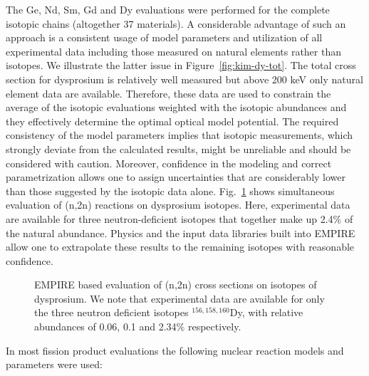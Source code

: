 The Ge, Nd, Sm, Gd and Dy evaluations were performed for the complete
isotopic chains (altogether 37 materials). A considerable advantage of such
an approach is a consistent usage of model parameters and utilization of all
experimental data including those measured on natural elements rather than
isotopes. We illustrate the latter issue in Figure~\ref{fig:kim-dy-tot}. The
total cross section for dysprosium is relatively well measured but above 200
keV only natural element data are available. Therefore, these data are used
to constrain the average of the isotopic evaluations weighted with the
isotopic abundances and they effectively determine the optimal optical model
potential. The required consistency of the model parameters implies that
isotopic measurements, which strongly deviate from the calculated results,
might be unreliable and should be considered with caution. Moreover,
confidence in the modeling and correct parametrization allows one to assign
uncertainties that are considerably lower than those suggested by the
isotopic data alone. Fig.~\ref{fig:kim-dy-n2n} shows simultaneous evaluation
of (n,2n) reactions on dysprosium isotopes.
Here, experimental data are available for three neutron-deficient
isotopes that together make up  2.4\% of
the natural abundance. Physics and the input data libraries built into EMPIRE
allow one to extrapolate these results to the remaining isotopes with
reasonable confidence.

\begin{figure*}[htbp]
 
\caption{EMPIRE based evaluation of total cross sections on isotopes of
dysprosium. The left panel shows the comparison of data measured on the
natural element with the appropriate average of the isotopic cross sections
plotted in the right panel.}
\label{fig:kim-dy-tot}
\end{figure*}

\begin{figure}[htbp]
\caption{EMPIRE based evaluation of (n,2n) cross sections on isotopes of
dysprosium. We note that experimental data are available for only the three
neutron deficient isotopes $^{156,158,160}$Dy, with relative abundances of
0.06, 0.1 and 2.34\% respectively.}
\label{fig:kim-dy-n2n}
\end{figure}

In most fission product evaluations the following nuclear reaction models
and parameters were used:

